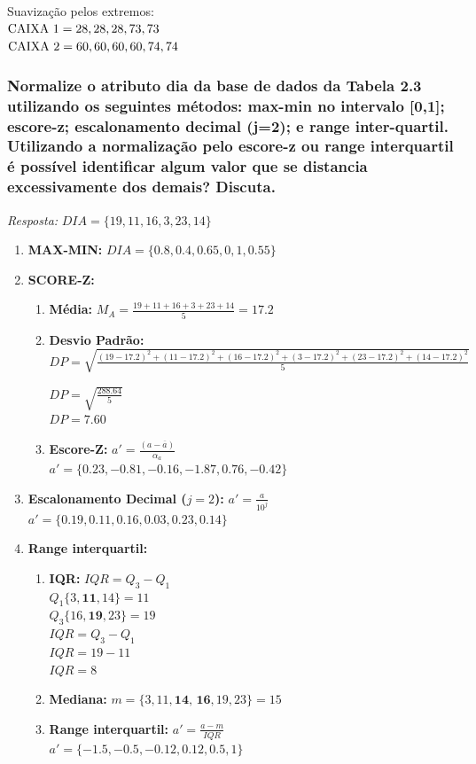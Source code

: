 \documentclass{article}
\begin{document}
Suavização pelos extremos: \\
$\textnormal{CAIXA 1} = 28, 28, 28, 73, 73$ \\
$\textnormal{CAIXA 2} = 60, 60, 60, 60, 74, 74$

\subsubsection{Normalize o atributo dia da base de dados da Tabela 2.3 utilizando os seguintes métodos: max-min no intervalo [0,1]; escore-z; escalonamento decimal (j=2); e range inter-quartil. Utilizando a normalização pelo escore-z ou range interquartil é possível identificar algum valor que se distancia excessivamente dos demais? Discuta.}
\textit{Resposta:}
$DIA = \{ 19, 11, 16, 3, 23, 14 \}$

\begin{enumerate}
  \item \textbf{MAX-MIN:} $DIA = \{ 0.8, 0.4, 0.65, 0, 1, 0.55 \}$
  \item \textbf{SCORE-Z:}
  \begin{enumerate}
    \item \textbf{Média:} $M_A = \frac{19 + 11 + 16 + 3 + 23 + 14}{5} = 17.2$
    \item \textbf{Desvio Padrão:} $DP = \sqrt{ \frac{ (19 - 17.2)^2 + (11 - 17.2)^2 + (16 - 17.2)^2 + (3 - 17.2)^2 + (23 - 17.2)^2 + (14 - 17.2)^2}{5} }$ \\
    \begin{center}
      $DP =  \sqrt{\frac{288.64}{5}} $ \\
      $DP = 7.60 $
    \end{center}    
    \item \textbf{Escore-Z:} $ a' = \frac{(a - \overline{a})}{\alpha_a} $ \\
    $ a' = \{ 0.23, -0.81, -0.16, -1.87, 0.76, -0.42 \}$
  \end{enumerate}
  
  \item \textbf{Escalonamento Decimal ($j=2$):} $a' = \frac{a}{10^j}$ \\
  $a' = \{0.19, 0.11, 0.16, 0.03, 0.23, 0.14\}$
  
  \item \textbf{Range interquartil: }  
  
  \begin{enumerate}
    \item \textbf{IQR:} $IQR = Q_3 - Q_1$ \\
    $Q_1\{ 3, \textbf{11}, 14\} = 11$\\
    $Q_3\{ 16, \textbf{19}, 23\} = 19$\\
    $IQR = Q_3 - Q_1$\\
    $IQR = 19 - 11$\\
    $IQR = 8$
    \item \textbf{Mediana:} $m = \{ 3, 11, \textbf{14, 16}, 19, 23 \} = 15 $ 
    \item \textbf{Range interquartil:} $a' = \frac{a - m}{IQR}$\\
    $a' = \{ -1.5, -0.5, -0.12, 0.12, 0.5, 1\}$
  \end{enumerate}
\end{enumerate}
\end{document}
